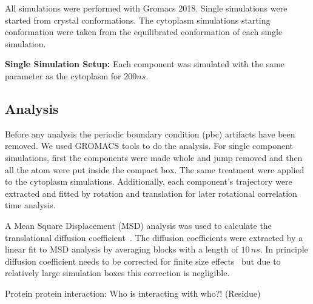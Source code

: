 \documentclass[journal=jacsat,manuscript=article]{achemso}
\begin{document}
All simulations were performed with Gromacs 2018. Single simulations were started from crystal conformations. The cytoplasm simulations starting conformation were taken from the equilibrated conformation of each single simulation.

{\bf Single Simulation Setup: } Each component was simulated with the same parameter as the cytoplasm for $200 ns$.

\subsection*{Analysis}
Before any analysis the periodic boundary condition (pbc) artifacts have been removed. We used GROMACS tools to do the analysis. For single component simulations, first the components were made whole and jump removed and then all the atom were put inside the compact box. The same treatment were applied to the cytoplasm simulations. Additionally, each component's trajectory were extracted and fitted by rotation and translation for later rotational correlation time analysis. 


A Mean Square Displacement (MSD) analysis was used to calculate the translational diffusion coefficient~\cite{Allen1987a}. The diffusion coefficients were extracted by a linear fit to MSD analysis by averaging blocks with a length of $10 \,ns$. In principle diffusion coefficient needs to be corrected for finite size effects~\cite{Yeh2004} but due to relatively large simulation boxes this correction is negligible.





Protein protein interaction: Who is interacting with who?! (Residue)
\end{document}
